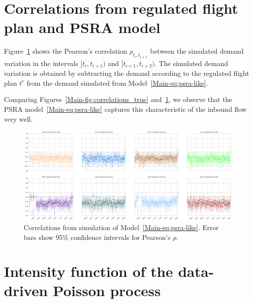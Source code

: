 \documentclass[]{elsarticle}
\begin{document}
\section{Correlations from regulated flight plan and \acs{PSRA} model}\label{sec:appb}

  Figure~\ref{fig:correlations_psra} shows the Pearson's correlation \(\rho_{t_i, t_{i+1}}\) between the simulated demand variation in the intervals \([t_i, t_{i+1})\) and \([t_{i+1}, t_{i+2})\). The simulated demand variation is obtained by subtracting the demand according to the regulated flight plan \(t^{r}\) from the demand simulated from Model~\eqref{Main-eq:psra-like}.

  Comparing Figures~\ref{Main-fig:correlations_true} and~\ref{fig:correlations_psra}, we observe that the \ac{PSRA} model~\eqref{Main-eq:psra-like} captures this characteristic of the inbound flow very well.

  \begin{figure}
      \includegraphics[width=\textwidth]{correlations_psra}
      \caption{Correlations from simulation of Model~\eqref{Main-eq:psra-like}. Error bars show 95\% confidence intervals for Pearson's \(\rho\).}
      \label{fig:correlations_psra}
  \end{figure}


\section{Intensity function of the data-driven Poisson process}\label{sec:appd}
\end{document}
